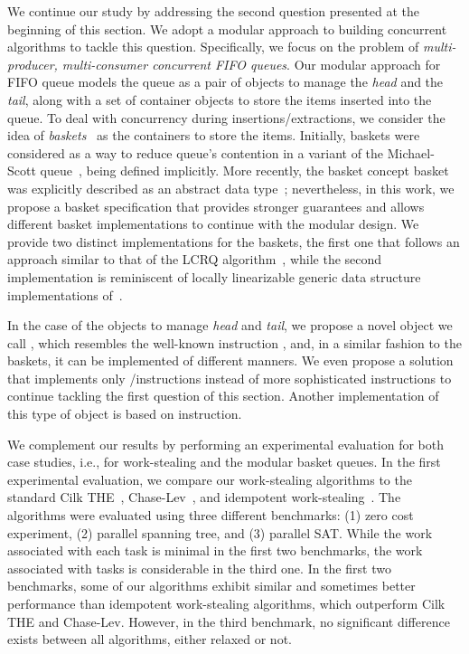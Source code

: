 We continue our study by addressing the second question presented at the beginning of this section. We adopt a modular approach to building concurrent algorithms to tackle this question. Specifically, we focus on the problem of \textit{multi-producer, multi-consumer concurrent FIFO queues}. Our modular approach for FIFO queue models the queue as a pair of objects to manage the \textit{head} and the \textit{tail}, along with a set of container objects to store the items inserted into the queue. To deal with concurrency during insertions/extractions, we consider the idea of \textit{baskets}~\cite{basketqueue2007} as the containers to store the items. Initially, baskets were considered as a way to reduce queue's \CAS contention in a variant of the Michael-Scott queue~\cite{DBLP_conf_podc_MichaelS96}, being defined implicitly. More recently, the basket concept basket was explicitly described as an abstract data type~\cite{scalingconcurrent2020}; nevertheless, in this work, we propose a basket specification that provides stronger guarantees and allows different basket implementations to continue with the modular design. We provide two distinct implementations for the baskets, the first one that follows an approach similar to that of the LCRQ algorithm~\cite{ppopp2013x86queues}, while the second implementation is reminiscent of locally linearizable generic data structure implementations of~\cite{DBLP_conf_concur_HaasHHKLPSSV16}.

 In the case of the objects to manage \textit{head} and \textit{tail}, we propose a novel object we call \llic, which resembles the well-known instruction \llsc, and, in a similar fashion to the baskets, it can be implemented of different manners. We even propose a solution that implements only \R/\W instructions instead of more sophisticated \RMW instructions to continue tackling the first question of this section. Another implementation of this type of object is based on \CAS instruction.

 We complement our results by performing an experimental evaluation for both case studies, i.e., for work-stealing and the modular basket queues. In the first experimental evaluation, we compare our work-stealing algorithms to the standard Cilk THE~\cite{DBLP_conf_pldi_FrigoLR98}, Chase-Lev~\cite{circular.work.stealing}, and idempotent work-stealing~\cite{maged.vechev.2009}. The algorithms were evaluated using three different benchmarks: (1) zero cost experiment, (2) parallel spanning tree, and (3) parallel SAT. While the work associated with each task is minimal in the first two benchmarks, the work associated with tasks is considerable in the third one. In the first two benchmarks, some of our algorithms exhibit similar and sometimes better performance than idempotent work-stealing algorithms, which outperform Cilk THE and Chase-Lev. However, in the third benchmark, no significant difference exists between all algorithms, either relaxed or not.

